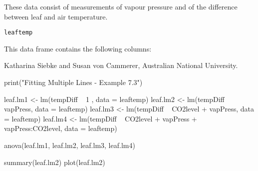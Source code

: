 \begin{Description}\relax
These data consist of measurements of vapour pressure and of the 
difference between leaf and air temperature.
\end{Description}
\begin{Usage}
\begin{verbatim}leaftemp\end{verbatim}
\end{Usage}
\begin{Format}\relax
This data frame contains the following columns:
\end{Format}
\begin{Source}\relax
Katharina Siebke and Susan von Cammerer, Australian National University.
\end{Source}
\begin{Examples}
\begin{ExampleCode}
print("Fitting Multiple Lines - Example 7.3")

leaf.lm1 <- lm(tempDiff ~ 1 , data = leaftemp)
leaf.lm2 <- lm(tempDiff ~ vapPress, data = leaftemp)
leaf.lm3 <- lm(tempDiff ~ CO2level + vapPress, data = leaftemp)
leaf.lm4 <- lm(tempDiff ~ CO2level + vapPress + vapPress:CO2level,
  data = leaftemp)

anova(leaf.lm1, leaf.lm2, leaf.lm3, leaf.lm4)

summary(leaf.lm2)
plot(leaf.lm2)

\end{ExampleCode}
\end{Examples}

